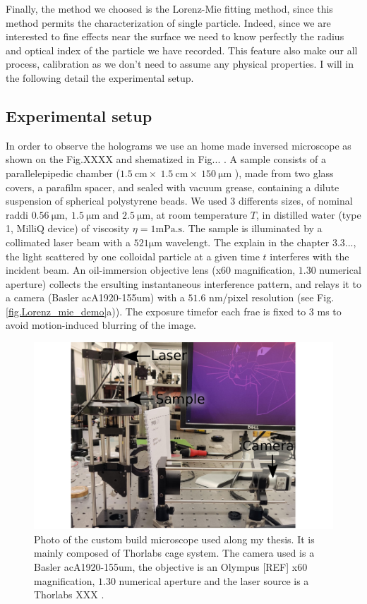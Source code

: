 Finally, the method we choosed is the Lorenz-Mie fitting method, since this method permits the characterization of single particle. Indeed, since we are interested to fine effects near the surface we need to know perfectly the radius and optical index of the particle we have recorded. This feature also make our all process, calibration as we don't need to assume any physical properties. I will in the following detail the experimental setup.


\subsection{Experimental setup}
\label{chap:exp-setup}
In order to observe the holograms we use an home made inversed microscope as shown on the Fig.XXXX and shematized in Fig... . A sample consists of a parallelepipedic chamber ($1.5 ~ \text{cm} \times ~ 1.5 ~ \text{cm} \times ~ 150 ~ \mathrm{\mu m} $ ), made from two glass covers, a parafilm spacer, and sealed with vacuum grease, containing a dilute suspension of spherical polystyrene beads. We used 3 differents sizes, of nominal raddi $0.56 ~ \mathrm{\mu m}, ~ 1.5 ~ \mathrm{\mu m} \text{ and } 2.5 ~ \mathrm{\mu m} $, at room temperature $T$, in distilled water (type 1, MilliQ device) of viscosity $\eta = 1 \mathrm{mPa.s}$. The sample is illuminated by a collimated laser beam with a $521 \mathrm{\mu m}$ wavelengt. The explain in the chapter 3.3..., the light scattered by one colloidal particle at a given time $t$ interferes with the incident beam. An oil-immersion objective lens (x60 magnification, $1.30$ numerical aperture) collects the ersulting instantaneous interference pattern, and relays it to a camera (Basler acA1920-155um) with a $51.6$ nm/pixel resolution (see Fig.\ref{fig.Lorenz_mie_demo}a)). The exposure timefor each frae is fixed to $3$ ms to avoid motion-induced blurring of the image.

\begin{figure}[h!]
	\centering
	\includegraphics{02_body/chapter2/images/figures_setup/photo_setup.pdf}
	\caption{Photo of the custom build microscope used along my thesis. It is mainly composed of Thorlabs cage system. The camera used is a Basler acA1920-155um, the objective is an Olympus [REF] x60 magnification, $1.30$ numerical aperture and the laser source is a Thorlabs XXX .}
\end{figure}

